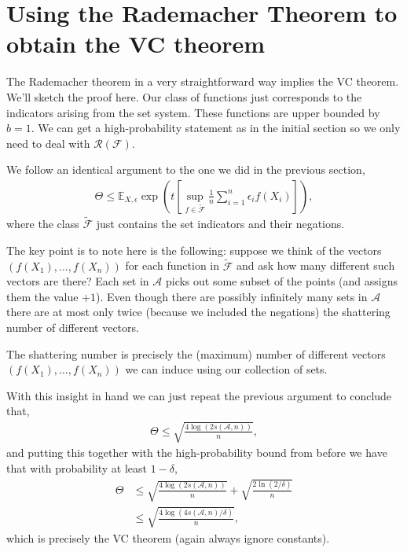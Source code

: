 \documentclass[twoside,12pt]{article}
\begin{document}



\section{Using the Rademacher Theorem to obtain the VC theorem}
The Rademacher theorem in a very straightforward way implies the VC theorem. We'll sketch the proof here. Our class of functions just corresponds to the indicators arising from the set system. These functions are upper bounded by $b = 1$. We can get a high-probability statement as in the initial section so we only need to deal with $\mathcal{R}(\mathcal{F})$.

We follow an identical argument to the one we did in the previous section,
\begin{align*}
\Theta \leq  \mathbb{E}_{X,\epsilon} \exp \left(t\left[ \sup_{f \in \widetilde{\mathcal{F}}}   \frac{1}{n} \sum_{i=1}^n \epsilon_i f(X_i) \right]\right),
\end{align*}
where the class $\widetilde{\mathcal{F}}$ just contains the set indicators and their negations. 

The key point is to note here is the following: suppose we think of the vectors $(f(X_1),\ldots,f(X_n))$ for each function in $\widetilde{\mathcal{F}}$ and ask how many different such vectors are there? Each set in $\mathcal{A}$ picks out some subset of the points (and assigns them the value $+1$).
Even though there are possibly infinitely many sets in $\mathcal{A}$ there are at most only twice (because we included the negations) the shattering number of different vectors.

The shattering number is precisely the (maximum) number of different vectors $(f(X_1),\ldots,f(X_n))$ we can induce using our collection of sets.

With this insight in hand we can just repeat the previous argument to conclude that,
\begin{align*}
\Theta \leq  \sqrt{\frac{4 \log(2 s(\mathcal{A},n))}{n}},
\end{align*}
and putting this together with the high-probability bound from before we have that with probability at least $1 - \delta$, 
\begin{align*}
\Theta &\leq  \sqrt{\frac{4 \log(2 s(\mathcal{A},n))}{n}} +  \sqrt{ \frac{2 \ln(2/\delta)}{n}} \\
&\leq  \sqrt{\frac{4 \log(4 s(\mathcal{A},n)/\delta)}{n}},
\end{align*}
which is precisely the VC theorem (again always ignore constants).
\end{document}
